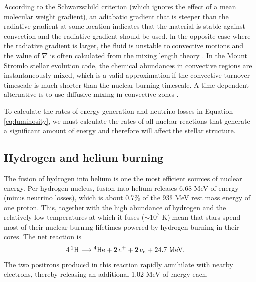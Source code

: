 According to the Schwarzschild criterion (which ignores the effect of a mean molecular weight gradient), an adiabatic gradient that is steeper than the radiative gradient at some location indicates that the material is stable against convection and the radiative gradient should be used. In the opposite case where the radiative gradient is larger, the fluid is unstable to convective motions and the value of $\nabla$ is often calculated from the mixing length theory \citep[MLT;][]{BohmVitense:1958ix}. In the Mount Stromlo stellar evolution code, the chemical abundances in convective regions are instantaneously mixed, which is a valid approximation if the convective turnover timescale is much shorter than the nuclear burning timescale. A time-dependent alternative is to use diffusive mixing in convective zones \citep[][as implemented in the nucleosythesis code used in this thesis]{Cannon:1993te}.

To calculate the rates of energy generation and neutrino losses in Equation \ref{eq:luminosity}, we must calculate the rates of all nuclear reactions that generate a significant amount of energy and therefore will affect the stellar structure.

\subsection{Hydrogen and helium burning}
The fusion of hydrogen into helium is one the most efficient sources of nuclear energy. Per hydrogen nucleus, fusion into helium releases 6.68 MeV of energy (minus neutrino losses), which is about 0.7\% of the 938 MeV rest mass energy of one proton. This, together with the high abundance of hydrogen and the relatively low temperatures at which it fuses ($\sim 10^7$ K) mean that stars spend most of their nuclear-burning lifetimes powered by hydrogen burning in their cores. The net reaction is
\begin{align*}
	4\,\mbox{${}^{1}{\text{H}}$} &\longrightarrow \mbox{${}^{4}{\text{He}}$} + 2\,e^+ + 2\,\nu_e + 24.7\text{ MeV.}
\end{align*}
The two positrons produced in this reaction rapidly annihilate with nearby electrons, thereby releasing an additional 1.02 MeV of energy each.

